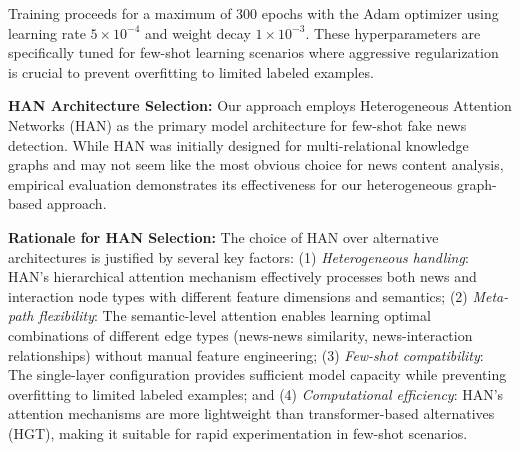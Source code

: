 Training proceeds for a maximum of 300 epochs with the Adam optimizer using learning rate $5 \times 10^{-4}$ and weight decay $1 \times 10^{-3}$. These hyperparameters are specifically tuned for few-shot learning scenarios where aggressive regularization is crucial to prevent overfitting to limited labeled examples.

\textbf{HAN Architecture Selection:} Our approach employs Heterogeneous Attention Networks (HAN) as the primary model architecture for few-shot fake news detection. While HAN was initially designed for multi-relational knowledge graphs and may not seem like the most obvious choice for news content analysis, empirical evaluation demonstrates its effectiveness for our heterogeneous graph-based approach.

\textbf{Rationale for HAN Selection:} The choice of HAN over alternative architectures is justified by several key factors: (1) \emph{Heterogeneous handling}: HAN's hierarchical attention mechanism effectively processes both news and interaction node types with different feature dimensions and semantics; (2) \emph{Meta-path flexibility}: The semantic-level attention enables learning optimal combinations of different edge types (news-news similarity, news-interaction relationships) without manual feature engineering; (3) \emph{Few-shot compatibility}: The single-layer configuration provides sufficient model capacity while preventing overfitting to limited labeled examples; and (4) \emph{Computational efficiency}: HAN's attention mechanisms are more lightweight than transformer-based alternatives (HGT), making it suitable for rapid experimentation in few-shot scenarios.

\EndChapter
